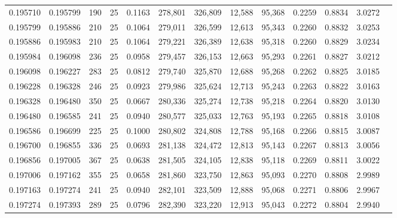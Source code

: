 \begin{tabular}{rrrrrrrrrrrrr}
0.195710 & 0.195799 &   190 &  25 &                                     0.1163 & 278,801 & 326,809 &  12,588 &  95,368 & 0.2259 & 0.8834 & 3.0272 \\
0.195799 & 0.195886 &   210 &  25 &                                     0.1064 & 279,011 & 326,599 &  12,613 &  95,343 & 0.2260 & 0.8832 & 3.0253 \\
0.195886 & 0.195983 &   210 &  25 &                                     0.1064 & 279,221 & 326,389 &  12,638 &  95,318 & 0.2260 & 0.8829 & 3.0234 \\
0.195984 & 0.196098 &   236 &  25 &                                     0.0958 & 279,457 & 326,153 &  12,663 &  95,293 & 0.2261 & 0.8827 & 3.0212 \\
0.196098 & 0.196227 &   283 &  25 &                                     0.0812 & 279,740 & 325,870 &  12,688 &  95,268 & 0.2262 & 0.8825 & 3.0185 \\
0.196228 & 0.196328 &   246 &  25 &                                     0.0923 & 279,986 & 325,624 &  12,713 &  95,243 & 0.2263 & 0.8822 & 3.0163 \\
0.196328 & 0.196480 &   350 &  25 &                                     0.0667 & 280,336 & 325,274 &  12,738 &  95,218 & 0.2264 & 0.8820 & 3.0130 \\
0.196480 & 0.196585 &   241 &  25 &                                     0.0940 & 280,577 & 325,033 &  12,763 &  95,193 & 0.2265 & 0.8818 & 3.0108 \\
0.196586 & 0.196699 &   225 &  25 &                                     0.1000 & 280,802 & 324,808 &  12,788 &  95,168 & 0.2266 & 0.8815 & 3.0087 \\
0.196700 & 0.196855 &   336 &  25 &                                     0.0693 & 281,138 & 324,472 &  12,813 &  95,143 & 0.2267 & 0.8813 & 3.0056 \\
0.196856 & 0.197005 &   367 &  25 &                                     0.0638 & 281,505 & 324,105 &  12,838 &  95,118 & 0.2269 & 0.8811 & 3.0022 \\
0.197006 & 0.197162 &   355 &  25 &                                     0.0658 & 281,860 & 323,750 &  12,863 &  95,093 & 0.2270 & 0.8808 & 2.9989 \\
0.197163 & 0.197274 &   241 &  25 &                                     0.0940 & 282,101 & 323,509 &  12,888 &  95,068 & 0.2271 & 0.8806 & 2.9967 \\
0.197274 & 0.197393 &   289 &  25 &                                     0.0796 & 282,390 & 323,220 &  12,913 &  95,043 & 0.2272 & 0.8804 & 2.9940 \\

\end{tabular}
